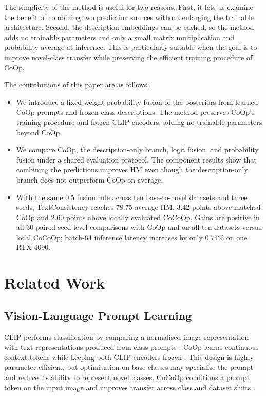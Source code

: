 \documentclass[preprint,12pt]{elsarticle}
\begin{document}
The simplicity of the method is useful for two reasons. First, it lets us examine the benefit of combining two prediction sources without enlarging the trainable architecture. Second, the description embeddings can be cached, so the method adds no trainable parameters and only a small matrix multiplication and probability average at inference. This is particularly suitable when the goal is to improve novel-class transfer while preserving the efficient training procedure of CoOp.

The contributions of this paper are as follows:
\begin{itemize}
    \item We introduce a fixed-weight probability fusion of the posteriors from learned CoOp prompts and frozen class descriptions. The method preserves CoOp's training procedure and frozen CLIP encoders, adding no trainable parameters beyond CoOp.
    \item We compare CoOp, the description-only branch, logit fusion, and probability fusion under a shared evaluation protocol. The component results show that combining the predictions improves HM even though the description-only branch does not outperform CoOp on average.
    \item With the same 0.5 fusion rule across ten base-to-novel datasets and three seeds, TextConsistency reaches 78.75 average HM, 3.42 points above matched CoOp and 2.60 points above locally evaluated CoCoOp. Gains are positive in all 30 paired seed-level comparisons with CoOp and on all ten datasets versus local CoCoOp; batch-64 inference latency increases by only 0.74\% on one RTX 4090.
\end{itemize}

\section{Related Work}
\label{sec:related}

\subsection{Vision-Language Prompt Learning}

CLIP performs classification by comparing a normalised image representation with text representations produced from class prompts \cite{radford2021clip}. CoOp learns continuous context tokens while keeping both CLIP encoders frozen \cite{zhou2022coop}. This design is highly parameter efficient, but optimisation on base classes may specialise the prompt and reduce its ability to represent novel classes. CoCoOp conditions a prompt token on the input image and improves transfer across class and dataset shifts \cite{zhou2022cocoop}.
\end{document}
